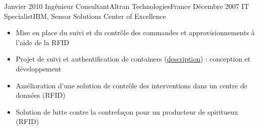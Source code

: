 \begin{experiences}
  \consultantexperience
  {Janvier 2010}    {Ingénieur Consultant}{Altran Technologies}{France}
  {Décembre 2007}   {IT Specialist}{IBM, Sensor Solutions Center of Excellence}
                    {
                      \begin{itemize}
                        \item Mise en place du suivi et du contrôle des commandes et approvisionnements à l'aide de la RFID
                        \item Projet de suivi et authentification de containers (\href{http://www.container-centralen.co.uk/rfid/history.aspx}{description}) : conception et développement
                        \item Amélioration d'une solution de contrôle des interventions dans un centre de données (RFID)
                        \item Solution de lutte contre la contrefaçon pour un producteur de spiritueux (RFID)           

\end{itemize}}
\end{experiences}
